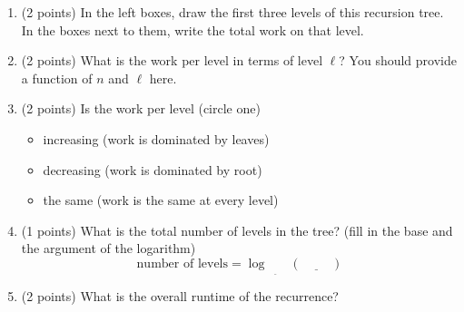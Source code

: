 \documentclass[11pt]{article}
\begin{document}
\begin{enumerate}
\begin{algo}
    \end{algo}

\newpage Now, we will solve a recurrence (not the one for Mergesort) using
recursion trees.

Consider the recurrence $T(n) = 3T(n/4) + n, T(1) = 1$.

\item (2 points) In the left boxes, draw the first three levels of this recursion tree.
In the boxes next to them, write the total work on that level.

\begin{center}
\end{center}
\item (2 points) What is the work per level in terms of level $\ell$? You should provide a function of $n$ and $\ell$ here.
\vspace{1in}
\item (2 points) Is the work per level (circle one)
\begin{itemize}
    \item increasing (work is dominated by leaves)
    \item decreasing (work is dominated by root)
    \item the same (work is the same at every level)
\end{itemize}
\item (1 points)  What is the total number of levels in the tree? (fill in the base and the argument of the logarithm)
\[
\text{number of levels} = \log_{\underline{\hspace{1cm}}}(\underline{\hspace{1cm}})
\]

\item (2 points) What is the overall runtime of the recurrence?


\end{enumerate}
\end{document}

